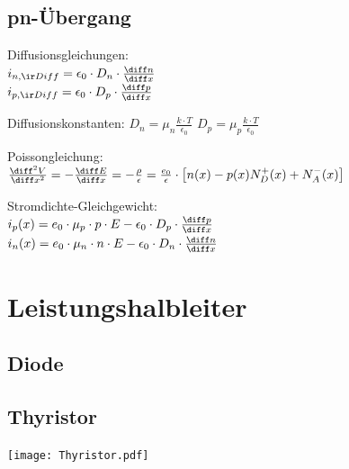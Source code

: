 \documentclass[fs, german]{latex4ei_fs}
\begin{document}
\begin{sectionbox}

\subsection{pn-Übergang}

Diffusionsgleichungen: \\
$i_{n, \ir Diff} = \epsilon_0 \cdot D_n \cdot \frac{\diff n}{\diff x}$\\
$i_{p, \ir Diff} = \epsilon_0 \cdot D_p \cdot \frac{\diff p}{\diff x}$

Diffusionskonstanten: 
$D_n = \mu_n \frac{k \cdot T}{\epsilon_0}$ \quad $D_p = \mu_p \frac{k \cdot T}{\epsilon_0}$

Poissongleichung: \\
 $\frac{\diff^2 V}{\diff x^2} = - \frac{\diff E}{\diff x} = - \frac{\rho}{\epsilon} = \frac{e_0}{\epsilon} \cdot \left[ n(x) - p(x)  N_D^+ (x) + N_A^- (x) \right]$

 Stromdichte-Gleichgewicht: \\
 $i_p (x) = e_0 \cdot \mu_p \cdot p \cdot E - \epsilon_0 \cdot D_p \cdot \frac{\diff p}{\diff x}$ \\
  $i_n (x) = e_0 \cdot \mu_n \cdot n \cdot E - \epsilon_0 \cdot D_n \cdot \frac{\diff n}{\diff x}$
\end{sectionbox}

\section{Leistungshalbleiter}

\begin{sectionbox}
\subsection{Diode}
\end{sectionbox}

\begin{sectionbox}
\subsection{Thyristor}
\texttt{[image: Thyristor.pdf]}

\end{sectionbox}
\end{document}
